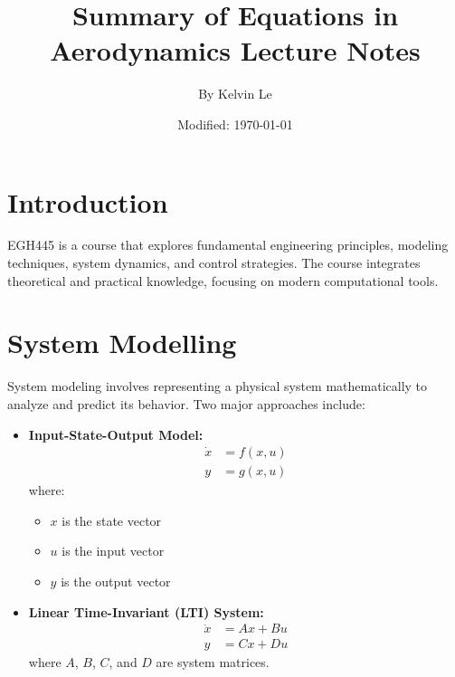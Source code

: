 \documentclass{article}
\begin{document}
\title{Summary of Equations in Aerodynamics Lecture Notes}
\author{By Kelvin Le}
\date{Modified: \today}
\maketitle

\tableofcontents

\section{Introduction}
EGH445 is a course that explores fundamental engineering principles, modeling
techniques, system dynamics, and control strategies. The course integrates
theoretical and practical knowledge, focusing on modern computational tools.

\section{System Modelling}
System modeling involves representing a physical system mathematically to
analyze and predict its behavior. Two major approaches include:
\begin{itemize}
      \item \textbf{Input-State-Output Model:}
            \begin{align*}
                  \dot{x} & = f(x, u) \\
                  y       & = g(x, u)
            \end{align*}
            where:
            \begin{itemize}
                  \item $x$ is the state vector
                  \item $u$ is the input vector
                  \item $y$ is the output vector
            \end{itemize}

      \item \textbf{Linear Time-Invariant (LTI) System:}
            \begin{align*}
                  \dot{x} & = Ax + Bu \\
                  y       & = Cx + Du
            \end{align*}
            where $A$, $B$, $C$, and $D$ are system matrices.
\end{itemize}
\end{document}
